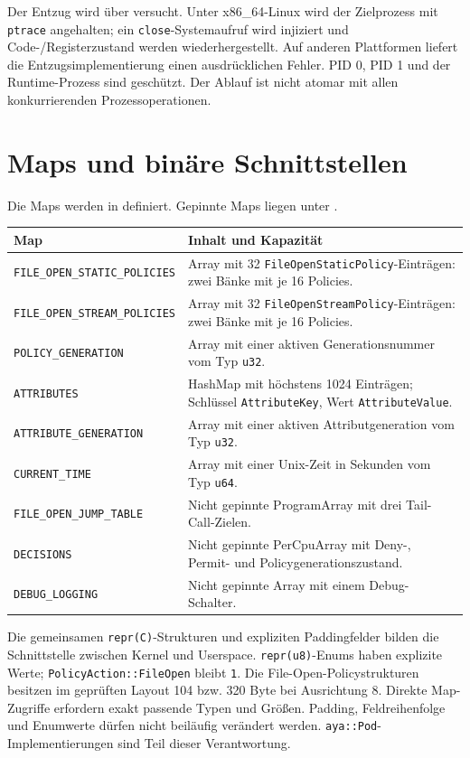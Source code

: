 \documentclass[12pt,a4paper]{article}
\begin{document}
Der Entzug wird über  versucht.
Unter x86\_64-Linux wird der Zielprozess mit \texttt{ptrace} angehalten; ein
\texttt{close}-Systemaufruf wird injiziert und Code-/Registerzustand werden
wiederhergestellt. Auf anderen Plattformen liefert die Entzugsimplementierung
einen ausdrücklichen Fehler. PID 0, PID 1 und der Runtime-Prozess sind geschützt.
Der Ablauf ist nicht atomar mit allen konkurrierenden Prozessoperationen.

\section{Maps und binäre Schnittstellen}
Die Maps werden in  definiert.
Gepinnte Maps liegen unter .
\begin{longtable}{>{\raggedright\arraybackslash}p{} >{\raggedright\arraybackslash}p{}}
\textbf{Map} & \textbf{Inhalt und Kapazität} \\
\hline
\endhead
\texttt{FILE\_OPEN\_STATIC\_POLICIES} & Array mit 32 \texttt{FileOpenStaticPolicy}-Einträgen: zwei Bänke mit je 16 Policies. \\
\texttt{FILE\_OPEN\_STREAM\_POLICIES} & Array mit 32 \texttt{FileOpenStreamPolicy}-Einträgen: zwei Bänke mit je 16 Policies. \\
\texttt{POLICY\_GENERATION} & Array mit einer aktiven Generationsnummer vom Typ \texttt{u32}. \\
\texttt{ATTRIBUTES} & HashMap mit höchstens 1024 Einträgen; Schlüssel \texttt{AttributeKey}, Wert \texttt{AttributeValue}. \\
\texttt{ATTRIBUTE\_GENERATION} & Array mit einer aktiven Attributgeneration vom Typ \texttt{u32}. \\
\texttt{CURRENT\_TIME} & Array mit einer Unix-Zeit in Sekunden vom Typ \texttt{u64}. \\
\texttt{FILE\_OPEN\_JUMP\_TABLE} & Nicht gepinnte ProgramArray mit drei Tail-Call-Zielen. \\
\texttt{DECISIONS} & Nicht gepinnte PerCpuArray mit Deny-, Permit- und Policygenerationszustand. \\
\texttt{DEBUG\_LOGGING} & Nicht gepinnte Array mit einem Debug-Schalter. \\
\end{longtable}

Die gemeinsamen \texttt{repr(C)}-Strukturen und expliziten Paddingfelder bilden
die Schnittstelle zwischen Kernel und Userspace. \texttt{repr(u8)}-Enums haben
explizite Werte; \texttt{PolicyAction::FileOpen} bleibt \texttt{1}.
Die File-Open-Policystrukturen besitzen im geprüften Layout 104 bzw. 320 Byte
bei Ausrichtung 8. Direkte Map-Zugriffe erfordern exakt passende Typen und Größen.
Padding, Feldreihenfolge und Enumwerte dürfen nicht beiläufig verändert werden.
\texttt{aya::Pod}-Implementierungen sind Teil dieser Verantwortung.
\end{document}
